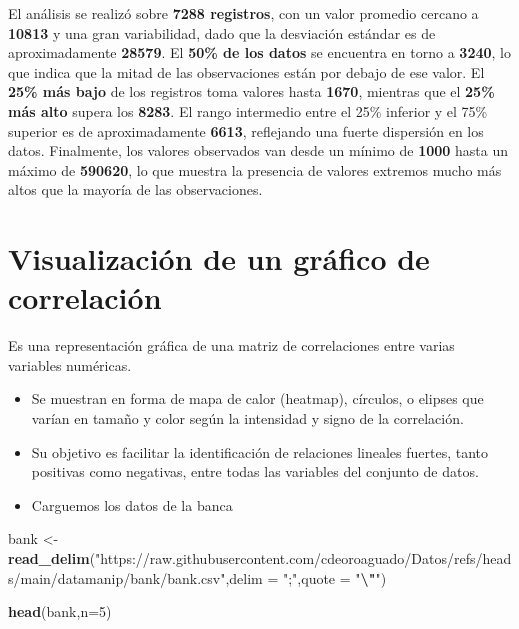 \documentclass[
]{book}
\newenvironment{Shaded}{\begin{snugshade}}{\end{snugshade}}
\newcommand{\AttributeTok}[1]{\textcolor[rgb]{0.13,0.29,0.53}{#1}}
\newcommand{\DecValTok}[1]{\textcolor[rgb]{0.00,0.00,0.81}{#1}}
\newcommand{\FunctionTok}[1]{\textcolor[rgb]{0.13,0.29,0.53}{\textbf{#1}}}
\newcommand{\NormalTok}[1]{#1}
\newcommand{\OtherTok}[1]{\textcolor[rgb]{0.56,0.35,0.01}{#1}}
\newcommand{\SpecialCharTok}[1]{\textcolor[rgb]{0.81,0.36,0.00}{\textbf{#1}}}
\newcommand{\StringTok}[1]{\textcolor[rgb]{0.31,0.60,0.02}{#1}}
\begin{document}
El análisis se realizó sobre \textbf{7288 registros}, con un valor promedio cercano a \textbf{10813} y una gran variabilidad, dado que la desviación estándar es de aproximadamente \textbf{28579}. El \textbf{50\% de los datos} se encuentra en torno a \textbf{3240}, lo que indica que la mitad de las observaciones están por debajo de ese valor. El \textbf{25\% más bajo} de los registros toma valores hasta \textbf{1670}, mientras que el \textbf{25\% más alto} supera los \textbf{8283}. El rango intermedio entre el 25\% inferior y el 75\% superior es de aproximadamente \textbf{6613}, reflejando una fuerte dispersión en los datos. Finalmente, los valores observados van desde un mínimo de \textbf{1000} hasta un máximo de \textbf{590620}, lo que muestra la presencia de valores extremos mucho más altos que la mayoría de las observaciones.

\section{Visualización de un gráfico de correlación}\label{visualizaciuxf3n-de-un-gruxe1fico-de-correlaciuxf3n}

Es una representación gráfica de una matriz de correlaciones entre varias variables numéricas.

\begin{itemize}
\item
  Se muestran en forma de mapa de calor (heatmap), círculos, o elipses que varían en tamaño y color según la intensidad y signo de la correlación.
\item
  Su objetivo es facilitar la identificación de relaciones lineales fuertes, tanto positivas como negativas, entre todas las variables del conjunto de datos.
\item
  Carguemos los datos de la banca
\end{itemize}

\begin{Shaded}
\begin{Highlighting}[]
\NormalTok{bank }\OtherTok{\textless{}{-}} \FunctionTok{read\_delim}\NormalTok{(}\StringTok{"https://raw.githubusercontent.com/cdeoroaguado/Datos/refs/heads/main/datamanip/bank/bank.csv"}\NormalTok{,}\AttributeTok{delim =} \StringTok{";"}\NormalTok{,}\AttributeTok{quote =} \StringTok{"}\SpecialCharTok{\textbackslash{}"}\StringTok{"}\NormalTok{)}

\FunctionTok{head}\NormalTok{(bank,}\AttributeTok{n=}\DecValTok{5}\NormalTok{)}
\end{Highlighting}
\end{Shaded}
\end{document}
